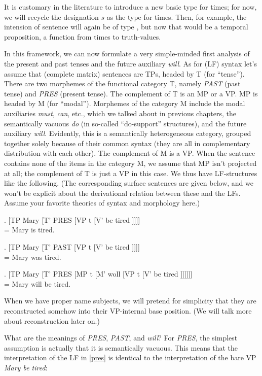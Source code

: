 It is customary in the literature to introduce a new basic type for times; for now, we will recycle the designation $s$ as the type for times. Then, for example, the intension of sentence will again be of type , but now that would be a temporal proposition, a function from times to truth-values.

In this framework, we can now formulate a very simple-minded first analysis of the present and past tenses and the future auxiliary \emph{will}. As for (LF) syntax let's assume that (complete matrix) sentences are TPs, headed by T (for ``tense''). There are two morphemes of the functional category T, namely \emph{PAST} (past tense) and \emph{PRES} (present tense). The complement of T is an MP or a VP. MP is headed by M (for ``modal''). Morphemes of the category M include the modal auxiliaries \emph{must}, \emph{can}, etc., which we talked about in previous chapters, the semantically vacuous \emph{do} (in so-called ``do-support'' structures), and the future auxiliary \emph{will}. Evidently, this is a semantically heterogeneous category, grouped together solely because of their common syntax (they are all in complementary distribution with each other). The complement of M is a VP. When the sentence contains none of the items in the category M, we assume that MP isn't projected at all; the complement of T is just a VP in this case. We thus have LF-structures like the following. (The corresponding surface sentences are given below, and we won't be explicit about the derivational relation between these and the LFs. Assume your favorite theories of syntax and morphology here.)

\exi.  \label{pres}[TP Mary [T' PRES [VP t [V' be tired ]]]] \\= Mary is tired.

\exi.  \label{past}[TP Mary [T' PAST [VP t [V' be tired ]]]] \\= Mary was tired.

\exi.  [TP Mary [T' PRES [MP t [M' woll [VP t [V' be tired ]]]]]] \\= Mary will be tired.

When we have proper name subjects, we will pretend for simplicity that they are reconstructed somehow into their VP-internal base position. (We will talk more about reconstruction later on.)

What are the meanings of \emph{PRES}, \emph{PAST}, and \emph{will}? For \emph{PRES}, the simplest assumption is actually that it is semantically vacuous. This means that the interpretation of the LF in \ref{pres} is identical to the interpretation of the bare VP \emph{Mary be tired}:

